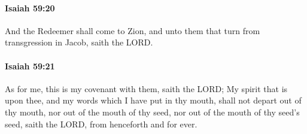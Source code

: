 		\paragraph{Isaiah 59:20} %
			\label{ISAIAH-59-20}

			And the Redeemer shall come to Zion, and unto them that turn from transgression in Jacob, saith the LORD.


		\paragraph{Isaiah 59:21} %
			\label{ISAIAH-59-21}

			As for me, this is my covenant with them, saith the LORD; My spirit that is upon thee, and my words which I have put in thy mouth, shall not depart out of thy mouth, nor out of the mouth of thy seed, nor out of the mouth of thy seed's seed, saith the LORD, from henceforth and for ever.

